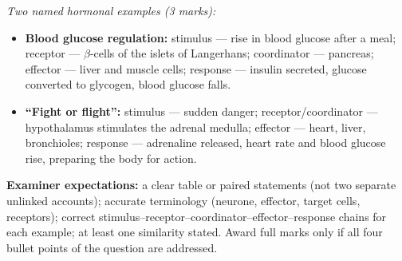 \documentclass[11pt]{article}
\begin{document}
\begin{corrige}
\emph{Two named hormonal examples (3 marks):}
\begin{itemize}
\item \textbf{Blood glucose regulation:} stimulus — rise in blood glucose after a meal; receptor — $\beta$-cells of the islets of Langerhans; coordinator — pancreas; effector — liver and muscle cells; response — insulin secreted, glucose converted to glycogen, blood glucose falls.
\item \textbf{``Fight or flight'':} stimulus — sudden danger; receptor/coordinator — hypothalamus stimulates the adrenal medulla; effector — heart, liver, bronchioles; response — adrenaline released, heart rate and blood glucose rise, preparing the body for action.
\end{itemize}

\textbf{Examiner expectations:} a clear table or paired statements (not two separate unlinked accounts); accurate terminology (neurone, effector, target cells, receptors); correct stimulus--receptor--coordinator--effector--response chains for each example; at least one similarity stated. Award full marks only if all four bullet points of the question are addressed.
\end{corrige}
\end{document}
